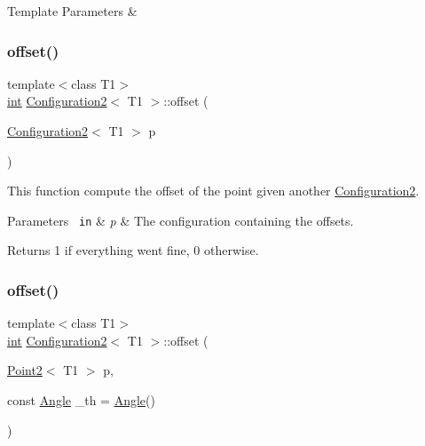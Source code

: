 \begin{DoxyTemplParams}{Template Parameters}
{\em } & \\
\hline
\end{DoxyTemplParams}
\mbox{\label{class_configuration2_abc07742a00822719024a8a58d003a6f1}} 
\subsubsection{\texorpdfstring{offset()}{offset()}\hspace{0.1cm}{\footnotesize\ttfamily [2/3]}}
{\footnotesize\ttfamily template$<$class T1$>$ \\
\mbox{\hyperlink{draw_8hh_aa620a13339ac3a1177c86edc549fda9b}{int}} \mbox{\hyperlink{class_configuration2}{Configuration2}}$<$ T1 $>$\+::offset (\begin{DoxyParamCaption}\item[{\mbox{\hyperlink{class_configuration2}{Configuration2}}$<$ T1 $>$}]{p }\end{DoxyParamCaption})\hspace{0.3cm}{\ttfamily [inline]}}



This function compute the offset of the point given another {\ttfamily \mbox{\hyperlink{class_configuration2}{Configuration2}}}. 


\begin{DoxyParams}[1]{Parameters}
\mbox{\texttt{ in}}  & {\em p} & The configuration containing the offsets. \\
\hline
\end{DoxyParams}
\begin{DoxyReturn}{Returns}
1 if everything went fine, 0 otherwise. 
\end{DoxyReturn}
\mbox{\label{class_configuration2_ad2f7df498d8fd4c0e125a1f628fa22b7}} 
\subsubsection{\texorpdfstring{offset()}{offset()}\hspace{0.1cm}{\footnotesize\ttfamily [3/3]}}
{\footnotesize\ttfamily template$<$class T1$>$ \\
\mbox{\hyperlink{draw_8hh_aa620a13339ac3a1177c86edc549fda9b}{int}} \mbox{\hyperlink{class_configuration2}{Configuration2}}$<$ T1 $>$\+::offset (\begin{DoxyParamCaption}\item[{\mbox{\hyperlink{class_point2}{Point2}}$<$ T1 $>$}]{p,  }\item[{const \mbox{\hyperlink{class_angle}{Angle}}}]{\+\_\+th = {\ttfamily \mbox{\hyperlink{class_angle}{Angle}}()} }\end{DoxyParamCaption})\hspace{0.3cm}{\ttfamily [inline]}}



